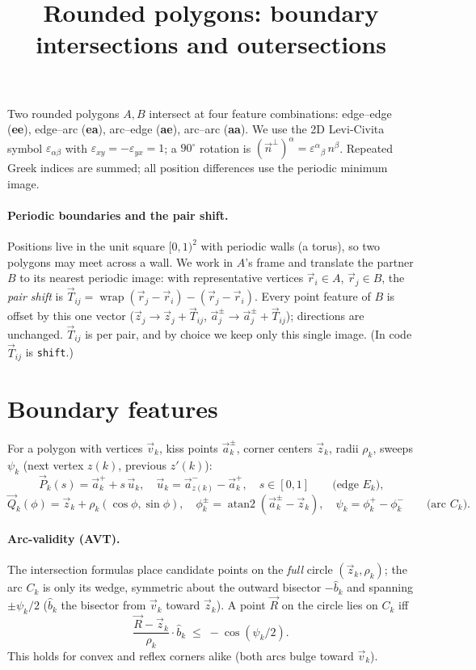 \documentclass[11pt]{article}
\title{Rounded polygons: boundary intersections and outersections}
\date{}
\author{}
\newcommand{\vv}[1]{\vec{#1}}
\DeclareMathOperator{\atantwo}{atan2}
\begin{document}
\maketitle

Two rounded polygons $A,B$ intersect at four feature combinations: edge--edge (\textbf{ee}),
edge--arc (\textbf{ea}), arc--edge (\textbf{ae}), arc--arc (\textbf{aa}). We use the 2D
Levi-Civita symbol $\varepsilon_{\alpha\beta}$ with $\varepsilon_{xy}=-\varepsilon_{yx}=1$; a
$90^\circ$ rotation is $(\vv n^{\perp})^{\alpha}=\varepsilon^{\alpha}{}_{\beta}\,n^{\beta}$.
Repeated Greek indices are summed; all position differences use the periodic minimum image.

\paragraph{Periodic boundaries and the pair shift.}
Positions live in the unit square $[0,1)^2$ with periodic walls (a torus), so two polygons may
meet across a wall. We work in $A$'s frame and translate the partner $B$ to its nearest
periodic image: with representative vertices $\vv r_i\in A$, $\vv r_j\in B$, the \emph{pair
shift} is $\vv T_{ij}=\operatorname{wrap}(\vv r_j-\vv r_i)-(\vv r_j-\vv r_i)$. Every point
feature of $B$ is offset by this one vector ($\vv z_j\to\vv z_j+\vv T_{ij}$, $\vv a^{\pm}_j\to
\vv a^{\pm}_j+\vv T_{ij}$); directions are unchanged. $\vv T_{ij}$ is per pair, and by choice
we keep only this single image. (In code $\vv T_{ij}$ is \texttt{shift}.)

\section{Boundary features}

For a polygon with vertices $\vv v_k$, kiss points $\vv a^{\pm}_k$, corner centers $\vv z_k$,
radii $\rho_k$, sweeps $\psi_k$ (next vertex $z(k)$, previous $z'(k)$):
\[
  \vv P_k(s)=\vv a^{+}_k+s\,\vv u_k,\quad \vv u_k=\vv a^{-}_{z(k)}-\vv a^{+}_k,\quad s\in[0,1]
  \qquad\text{(edge $E_k$),}
\]
\[
  \vv Q_k(\phi)=\vv z_k+\rho_k(\cos\phi,\sin\phi),\quad
  \phi^{\pm}_k=\atantwo(\vv a^{\pm}_k-\vv z_k),\quad \psi_k=\phi^{+}_k-\phi^{-}_k
  \qquad\text{(arc $C_k$).}
\]

\paragraph{Arc-validity (AVT).}
The intersection formulas place candidate points on the \emph{full} circle $(\vv z_k,\rho_k)$; the
arc $C_k$ is only its wedge, symmetric about the outward bisector $-\hat b_k$ and spanning
$\pm\psi_k/2$ ($\hat b_k$ the bisector from $\vv v_k$ toward $\vv z_k$). A point $\vv R$ on the
circle lies on $C_k$ iff
\[
  \boxed{\;\frac{\vv R-\vv z_k}{\rho_k}\cdot\hat b_k \;\le\; -\cos(\psi_k/2).\;}
\]
This holds for convex and reflex corners alike (both arcs bulge toward $\vv v_k$).
\end{document}
